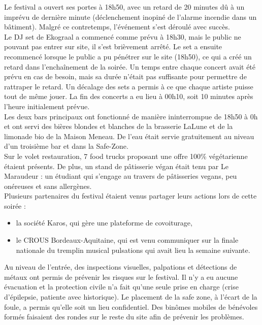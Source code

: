 \documentclass[12pt,a4paper]{report}
\begin{document}
Le festival a ouvert ses portes à 18h50, avec un retard de 20 minutes dû à un imprévu de dernière minute (déclenchement inopiné de l'alarme incendie dans un bâtiment). Malgré ce contretemps, l'événement s'est déroulé avec succès.\\

Le DJ set de Ekograal a commencé comme prévu à 18h30, mais le public ne pouvant pas entrer sur site, il s'est brièvement arrêté. Le set a ensuite recommencé lorsque le public a pu pénétrer sur le site (18h50), ce qui a créé un retard dans l'enchaînement de la soirée. Un temps entre chaque concert avait été prévu en cas de besoin, mais sa durée n'était pas suffisante pour permettre de rattraper le retard. Un décalage des sets a permis à ce que chaque artiste puisse tout de même jouer. La fin des concerts a eu lieu à 00h10, soit 10 minutes après l’heure initialement prévue.\\

Les deux bars principaux ont fonctionné de manière ininterrompue de 18h50 à 0h et ont servi des bières blondes et blanches de la brasserie LaLune et de la limonade bio de la Maison Meneau. De l’eau était servie gratuitement au niveau d’un troisième bar et dans la Safe-Zone.\\

Sur le volet restauration, 7 food trucks proposant une offre 100\% végétarienne étaient présents. De plus, un stand de pâtisserie végan était tenu par Le Maraudeur : un étudiant qui s'engage au travers de pâtisseries vegans, peu onéreuses et sans allergènes.\\

Plusieurs partenaires du festival étaient venus partager leurs actions lors de cette soirée : 
\begin{itemize}
\item la société Karos, qui gère une plateforme de covoiturage,
\item le CROUS Bordeaux-Aquitaine, qui est venu communiquer sur la finale nationale du tremplin musical pulsations qui avait lieu la semaine suivante.\\
\end{itemize}

Au niveau de l’entrée, des inspections visuelles, palpations et détections de métaux ont permis de prévenir les risques sur le festival. Il n'y a eu aucune évacuation et la protection civile n’a fait qu’une seule prise en charge (crise d'épilepsie, patiente avec historique). Le placement de la safe zone, à l'écart de la foule, a permis qu'elle soit un lieu confidentiel. Des binômes mobiles de bénévoles formés faisaient des rondes sur le reste du site afin de prévenir les problèmes.\\
\end{document}
